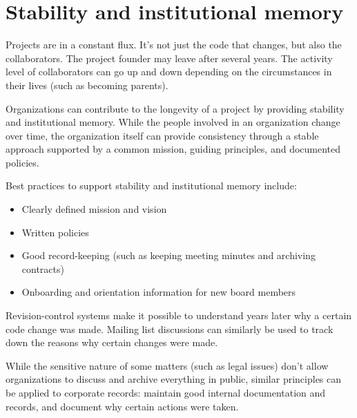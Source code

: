 


\chapter{Stability and institutional memory}

Projects are in a constant flux.  It's not just the code that changes, but also the collaborators.  The project founder may leave after several years.  The activity level of collaborators can go up and down depending on the circumstances in their lives (such as becoming parents).

Organizations can contribute to the longevity of a project by providing stability and institutional memory.  While the people involved in an organization change over time, the organization itself can provide consistency through a stable approach supported by a common mission, guiding principles, and documented policies.

Best practices to support stability and institutional memory include:

\begin{itemize}

\item Clearly defined mission and vision

\item Written policies

\item Good record-keeping (such as keeping meeting minutes and archiving contracts)

\item Onboarding and orientation information for new board members

\end{itemize}

Revision-control systems make it possible to understand years later why a certain code change was made.  Mailing list discussions can similarly be used to track down the reasons why certain changes were made.

While the sensitive nature of some matters (such as legal issues) don't allow organizations to discuss and archive everything in public, similar principles can be applied to corporate records: maintain good internal documentation and records, and document why certain actions were taken.

